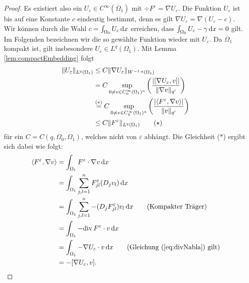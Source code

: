 \begin{proof}
  Es existiert also ein $U_\varepsilon \in C^\infty(\overline\Omega_1)$ mit $\div F^\varepsilon = \nabla U_\varepsilon$.
  Die Funktion $U_\varepsilon$ ist bis auf eine Konstante $c$ eindeutig bestimmt, denn es gilt $\nabla U_\varepsilon = \nabla( U_\varepsilon - c)$.
  Wir können durch die Wahl $c = \int_{\Omega_0} U_\varepsilon \, {\operatorname{d}\!{x}}$ erreichen, dass $\int_{\Omega_0} U_\varepsilon - \gamma \, {\operatorname{d}\!{x}} = 0$  gilt.
  Im Folgenden bezeichnen wir die so gewählte Funktion wieder mit $U_\varepsilon$.
  Da $\overline\Omega_1$ kompakt ist, gilt insbesondere $U_\varepsilon \in L^q(\Omega_1)$.
  Mit Lemma \ref{lem:compactEmbedding} folgt
  \begingroup
  \addtolength{\jot}{1em}
  \begin{align*}
    \lVert U_\varepsilon \rVert_{L^q(\Omega_1)}
    &\leq C \lVert  \nabla U_\varepsilon  \rVert_{W^{-1,q}(\Omega_1)} \\
    &= C \sup_{0 \neq v \in C_0^\infty(\Omega_1)^n} \left(\frac{|[\nabla U_\varepsilon, v]|}{\lVert \nabla v \rVert_{q'}} \right) \\
    &\overset{(\ast)}{=} C \sup_{0 \neq v \in C_0^\infty(\Omega_1)^n} \left( \frac{|\langle F^\varepsilon, \nabla v \rangle|}{\lVert v \rVert_{q'}}\right) \\
    &\leq C \lVert F^\varepsilon \rVert_{L^q(\Omega_1)} \tag{$\star$}
  \end{align*}
  \endgroup
  für ein $C = C(q,\Omega_0,\Omega_1)$, welches nicht von $\varepsilon$ abhängt. 
  Die Gleichheit ($\ast$) ergibt sich dabei wie folgt:
  \begin{align*}
    \langle F^\varepsilon, \nabla v \rangle
    &= \int_{\Omega_1} F^\varepsilon \cdot \nabla v \d x \\
    &= \int_{\Omega_1} \sum_{j,l=1}^n F_{jl}^\varepsilon (D_j v_l) \d x \\
    &= \int_{\Omega_1} \sum_{j,l=1}^n -(D_jF_{jl}^\varepsilon) v_l \d x \tag{Kompakter Träger}\\
    &= \int_{\Omega_1} -\div F^\varepsilon \cdot v \d x \\
    &= \int_{\Omega_1} -\nabla U_\varepsilon \cdot v \d x \tag{Gleichung (\ref{eq:divNabla}) gilt}\\
    &= -[\nabla U_\varepsilon, v].
  \end{align*}


\end{proof}
